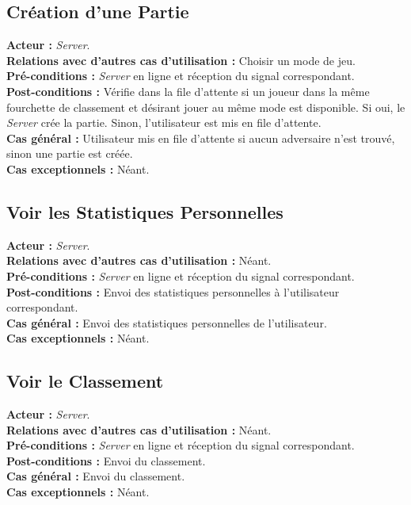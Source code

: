 \documentclass[10pt, a4paper]{article}
\begin{document}
\subsection{Création d'une Partie}
\textbf{Acteur :} \textit{Server}. \\
\textbf{Relations avec d'autres cas d'utilisation :} Choisir un mode de jeu. \\
\textbf{Pré-conditions :} \textit{Server} en ligne et réception du signal correspondant. \\
\textbf{Post-conditions :} Vérifie dans la file d'attente si un joueur dans la même fourchette de classement et désirant jouer au même mode est disponible. Si oui, le \textit{Server} crée la partie. Sinon, l'utilisateur est mis en file d'attente. \\
\textbf{Cas général :} Utilisateur mis en file d'attente si aucun adversaire n'est trouvé, sinon une partie est créée. \\
\textbf{Cas exceptionnels :} Néant. \\

\subsection{Voir les Statistiques Personnelles}
\textbf{Acteur :} \textit{Server}. \\
\textbf{Relations avec d'autres cas d'utilisation :} Néant. \\
\textbf{Pré-conditions :} \textit{Server} en ligne et réception du signal correspondant. \\
\textbf{Post-conditions :} Envoi des statistiques personnelles à l'utilisateur correspondant. \\
\textbf{Cas général :} Envoi des statistiques personnelles de l'utilisateur. \\
\textbf{Cas exceptionnels :} Néant. \\

\subsection{Voir le Classement}
\textbf{Acteur :} \textit{Server}. \\
\textbf{Relations avec d'autres cas d'utilisation :} Néant. \\
\textbf{Pré-conditions :} \textit{Server} en ligne et réception du signal correspondant. \\
\textbf{Post-conditions :} Envoi du classement. \\
\textbf{Cas général :} Envoi du classement. \\
\textbf{Cas exceptionnels :} Néant. \\
\end{document}
